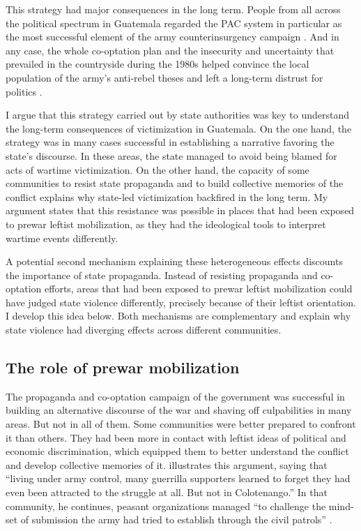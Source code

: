 \documentclass[12pt, notitlepage]{article}
\begin{document}
This strategy had major consequences in the long term.
People from all across the political spectrum in Guatemala regarded the PAC system in particular as the most successful element of the army counterinsurgency campaign \citep[101]{Garrard-Burnett:2010aa}.
And in any case, the whole co-optation plan and the insecurity and uncertainty that prevailed in the countryside during the 1980s helped convince the local population of the army's anti-rebel theses and left a long-term distrust for politics \citep{Green:1995aa}.

I argue that this strategy carried out by state authorities was key to understand the long-term consequences of victimization in Guatemala.
On the one hand, the strategy was in many cases successful in establishing a narrative favoring the state's discourse.
In these areas, the state managed to avoid being blamed for acts of wartime victimization.
On the other hand, the capacity of some communities to resist state propaganda and to build collective memories of the conflict explains why state-led victimization backfired in the long term.
My argument states that this resistance was possible in places that had been exposed to prewar leftist mobilization, as they had the ideological tools to interpret wartime events differently.

A potential second mechanism explaining these heterogeneous effects discounts the importance of state propaganda.
Instead of resisting propaganda and co-optation efforts, areas that had been exposed to prewar leftist mobilization could have judged state violence differently, precisely because of their leftist orientation.
I develop this idea below.
Both mechanisms are complementary and explain why state violence had diverging effects across different communities.

\subsection*{The role of prewar mobilization}

The propaganda and co-optation campaign of the government was successful in building an alternative discourse of the war and shaving off culpabilities in many areas.
But not in all of them.
Some communities were better prepared to confront it than others.
They had been more in contact with leftist ideas of political and economic discrimination, which equipped them to better understand the conflict and develop collective memories of it.
\citet[223]{Kobrak:2013aa} illustrates this argument, saying that ``living under army control, many guerrilla supporters learned to forget they had even been attracted to the struggle at all. But not in Colotenango.''
In that community, he continues, peasant organizations managed ``to challenge the mind-set of submission the army had tried to establish through the civil patrols'' \citep[226]{Kobrak:2013aa}.
\end{document}
